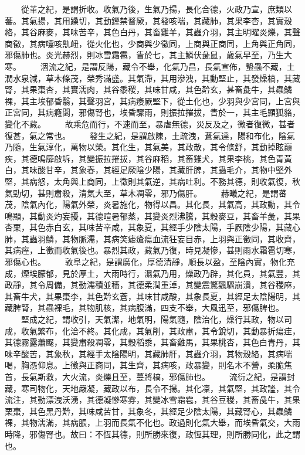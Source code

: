 　　從革之紀，是謂折收。收氣乃後，生氣乃揚，長化合德，火政乃宣，庶類以蕃。其氣揚，其用躁切，其動鏗禁瞀厥，其發咳喘，其藏肺，其果李杏，其實殼絡，其谷麻麥，其味苦辛，其色白丹，其畜雞羊，其蟲介羽，其主明曜炎爍，其聲商徵，其病嚏咳鼽衄，從火化也，少商與少徵同，上商與正商同，上角與正角同，邪傷肺也。炎光赫烈，則冰雪霜雹，眚於七，其主鱗伏彘鼠，歲氣早至，乃生大寒。
　　涸流之紀，是謂反陽，藏令不舉，化氣乃昌，長氣宣佈，蟄蟲不藏，土潤水泉減，草木條茂，榮秀滿盛。其氣滯，其用滲洩，其動堅止，其發燥槁，其藏腎，其果棗杏，其實濡肉，其谷黍稷，其味甘咸，其色黅玄，甚畜彘牛，其蟲鱗裸，其主埃郁昏翳，其聲羽宮，其病痿厥堅下，從土化也，少羽與少宮同，上宮與正宮同，其病癃閟，邪傷腎也，埃昏驟雨，則振拉摧拔，眚於一，其主毛顯狐貉，變化不藏。
　　故乘危而行，不速而至，暴虐無德，災反及之，微者復微，甚者復甚，氣之常也。
　　發生之紀，是謂啟陳，土疏洩，蒼氣達，陽和布化，陰氣乃隨，生氣淳化，萬物以榮。其化生，其氣美，其政散，其令條舒，其動掉眩巔疾，其德鳴靡啟坼，其變振拉摧拔，其谷麻稻，其畜雞犬，其果李桃，其色青黃白，其味酸甘辛，其象春，其經足厥陰少陽，其藏肝脾，其蟲毛介，其物中堅外堅，其病怒，太角與上商同，上徵則其氣逆，其病吐利。不務其德，則收氣復，秋氣勁切，甚則肅殺，清氣大至，草木凋零，邪乃傷肝。
　　赫曦之紀，是謂蕃茂，陰氣內化，陽氣外榮，炎暑施化，物得以昌。其化長，其氣高，其政動，其令鳴顯，其動炎灼妄擾，其德暄暑郁蒸，其變炎烈沸騰，其穀麥豆，其畜羊彘，其果杏栗，其色赤白玄，其味苦辛咸，其象夏，其經手少陰太陽，手厥陰少陽，其藏心肺，其蟲羽鱗，其物脈濡，其病笑瘧瘡瘍血流狂妄目赤，上羽與正徵同，其收齊，其病痓，上徵而收氣後也。暴烈其政，藏氣乃復，時見凝慘，甚則雨水霜雹切寒，邪傷心也。
　　敦阜之紀，是謂廣化，厚德清靜，順長以盈，至陰內實，物化充成，煙埃朦郁，見於厚土，大雨時行，濕氣乃用，燥政乃辟，其化員，其氣豐，其政靜，其令周備，其動濡積並稸，其德柔潤重淖，其變震驚飄驟崩潰，其谷稷麻，其畜牛犬，其果棗李，其色黅玄蒼，其味甘咸酸，其象長夏，其經足太陰陽明，其藏脾腎，其蟲裸毛，其物肌核，其病腹滿，四支不舉，大風迅至，邪傷脾也。
　　堅成之紀，謂收引，天氣潔，地氣明，陽氣隨，陰治化，燥行其政，物以司成，收氣繁布，化洽不終。其化成，其氣削，其政肅，其令銳切，其動暴折瘍疰，其德霧露蕭飋，其變肅殺凋零，其穀稻黍，其畜雞馬，其果桃杏，其色白青丹，其味辛酸苦，其象秋，其經手太陰陽明，其藏肺肝，其蟲介羽，其物殼絡，其病喘喝，胸憑仰息。上徵與正商同，其生齊，其病咳，政暴變，則名木不營，柔脆焦首，長氣斯救，大火流，炎爍且至，蔓將槁，邪傷肺也。
　　流衍之紀，是謂封藏，寒司物化，天地嚴凝，藏政以布，長令不揚。其化凜，其氣堅，其政謐，其令流注，其動漂洩沃湧，其德凝慘寒雰，其變冰雪霜雹，其谷豆稷，其畜彘牛，其果栗棗，其色黑丹黅，其味咸苦甘，其象冬，其經足少陰太陽，其藏腎心，其蟲鱗裸，其物濡滿，其病脹，上羽而長氣不化也。政過則化氣大舉，而埃昏氣交，大雨時降，邪傷腎也。故曰：不恆其德，則所勝來復，政恆其理，則所勝同化，此之謂也。

